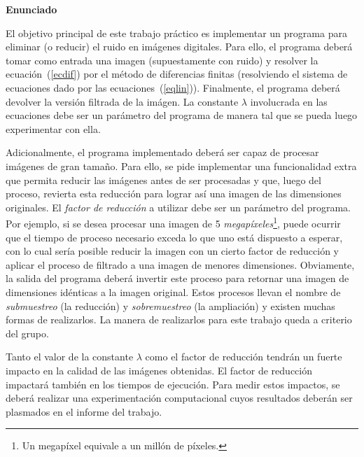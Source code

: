 \documentclass[a4paper]{article}
\begin{document}
{\bf Enunciado}

El objetivo principal de este trabajo pr\'actico es implementar un programa para eliminar (o reducir) el ruido en im\'agenes digitales. Para ello, el programa deber\'a tomar como entrada una imagen (supuestamente con ruido) y resolver la ecuaci\'on~(\ref{ecdif}) por el m\'etodo de diferencias finitas (resolviendo el sistema de ecuaciones dado por las ecuaciones~(\ref{eqlin})). Finalmente, el programa deber\'a devolver la versi\'on filtrada de la im\'agen. La constante $\lambda$ involucrada en las ecuaciones debe ser un par\'ametro del programa de manera tal que se pueda luego experimentar con ella.

Adicionalmente, el programa implementado deber\'a ser capaz de procesar im\'agenes de gran tama\~no. Para ello, se pide implementar una funcionalidad extra que permita reducir las im\'agenes antes de ser procesadas y que, luego del proceso, revierta esta reducci\'on para lograr as\'i una imagen de las dimensiones originales. El {\em factor de reducci\'on} a utilizar debe ser un par\'ametro del programa. Por ejemplo, si se desea procesar una imagen de 5 {\em megap\'ixeles}\footnote{Un megap\'ixel equivale a un mill\'on de p\'ixeles.}, puede ocurrir que el tiempo de proceso necesario exceda lo que uno est\'a dispuesto a esperar, con lo cual ser\'ia posible reducir la imagen con un cierto factor de reducci\'on y aplicar el proceso de filtrado a una imagen de menores dimensiones. Obviamente, la salida del programa deber\'a invertir este proceso para retornar una imagen de dimensiones id\'enticas a la imagen original. Estos procesos llevan el nombre de {\em submuestreo} (la reducci\'on) y {\em sobremuestreo} (la ampliaci\'on) y existen muchas formas de realizarlos. La manera de realizarlos para este trabajo queda a criterio del grupo.


Tanto el valor de la constante $\lambda$ como el factor de reducci\'on
tendr\'an un fuerte impacto en la calidad de las im\'agenes obtenidas. 
El factor de reducci\'on impactar\'a
tambi\'en en los tiempos de ejecuci\'on. Para medir estos impactos, se deber\'a realizar una experimentaci\'on computacional cuyos resultados deber\'an ser plasmados en el informe del trabajo.
\end{document}
